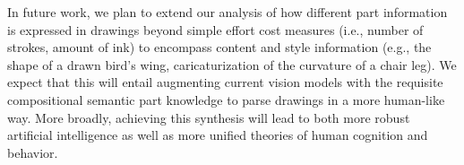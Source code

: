 \documentclass[10pt,letterpaper]{article}
\begin{document}
In future work, we plan to extend our analysis of how different part information is expressed in drawings beyond simple effort cost measures (i.e., number of strokes, amount of ink) to encompass content and style information (e.g., the shape of a drawn bird's wing, caricaturization of the curvature of a chair leg). 
We expect that this will entail augmenting current vision models with the requisite compositional semantic part knowledge to parse drawings in a more human-like way. 
More broadly, achieving this synthesis will lead to both more robust artificial intelligence as well as more unified theories of human cognition and behavior. 






\end{document}
